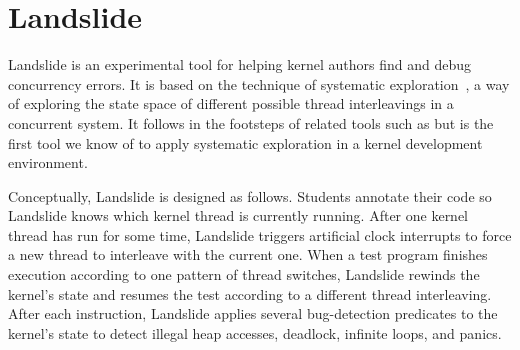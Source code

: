 \newcommand\hilight[2]{\color{#1}#2\color{black}}

\section{Landslide}
\label{sec:landslide}

Landslide is an experimental tool for helping kernel authors find and debug concurrency errors.
It is based on the technique of systematic exploration~\cite{verisoft}, a way of exploring the state space of different possible thread interleavings in a concurrent system.
It follows in the footsteps of related tools such as
but is the first tool we know of to apply systematic exploration in a kernel development environment.

Conceptually,
Landslide is designed as follows.
Students annotate their code so Landslide knows
which kernel thread is currently running.
After one kernel thread has run for some time,
Landslide triggers artificial clock interrupts
to force a new thread to interleave with the current one.
When a test program finishes execution according
to one pattern of thread switches,
Landslide rewinds the kernel's state
and resumes the test according to a different thread interleaving.
After each instruction,
Landslide applies several bug-detection predicates to
the kernel's state to detect
illegal heap accesses,
deadlock, infinite loops, and panics.

